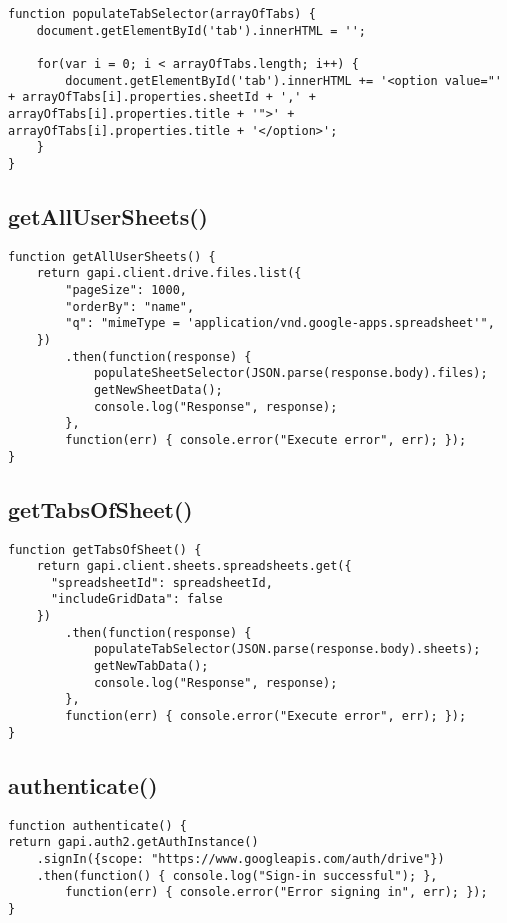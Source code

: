 \documentclass[letterpaper]{article}
\begin{document}
\begin{lstlisting}[firstnumber=48]
function populateTabSelector(arrayOfTabs) {
    document.getElementById('tab').innerHTML = '';

    for(var i = 0; i < arrayOfTabs.length; i++) {
        document.getElementById('tab').innerHTML += '<option value="' + arrayOfTabs[i].properties.sheetId + ',' + arrayOfTabs[i].properties.title + '">' + arrayOfTabs[i].properties.title + '</option>';
    }
}
\end{lstlisting}

\subsection{getAllUserSheets()}

\begin{lstlisting}[firstnumber=56]
function getAllUserSheets() {
    return gapi.client.drive.files.list({
        "pageSize": 1000,
        "orderBy": "name",
        "q": "mimeType = 'application/vnd.google-apps.spreadsheet'",
    })
        .then(function(response) {
            populateSheetSelector(JSON.parse(response.body).files);
            getNewSheetData();
            console.log("Response", response);
        },
        function(err) { console.error("Execute error", err); });
}
\end{lstlisting}

\subsection{getTabsOfSheet()}

\begin{lstlisting}[firstnumber=70]
function getTabsOfSheet() {
    return gapi.client.sheets.spreadsheets.get({
      "spreadsheetId": spreadsheetId,
      "includeGridData": false
    })
        .then(function(response) {
            populateTabSelector(JSON.parse(response.body).sheets);
            getNewTabData();
            console.log("Response", response);
        },
        function(err) { console.error("Execute error", err); });
}
\end{lstlisting}

\subsection{authenticate()}

\begin{lstlisting}[firstnumber=83]
function authenticate() {
return gapi.auth2.getAuthInstance()
    .signIn({scope: "https://www.googleapis.com/auth/drive"})
    .then(function() { console.log("Sign-in successful"); },
        function(err) { console.error("Error signing in", err); });
}
\end{lstlisting}
\end{document}

